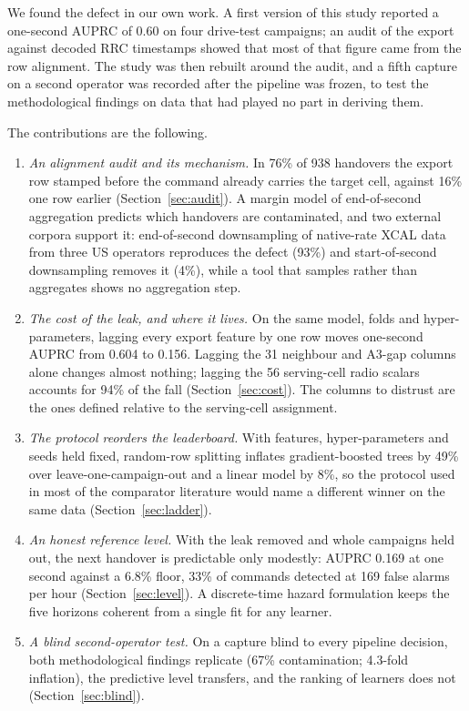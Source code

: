 \documentclass[preprint,review,12pt]{elsarticle}\usepackage{lineno}\linenumbers
\begin{document}
We found the defect in our own work. A first version of this study reported a one-second AUPRC of 0.60 on four drive-test campaigns; an audit of the export against decoded RRC timestamps showed that most of that figure came from the row alignment. The study was then rebuilt around the audit, and a fifth capture on a second operator was recorded after the pipeline was frozen, to test the methodological findings on data that had played no part in deriving them.

The contributions are the following.
\begin{enumerate}
\item \emph{An alignment audit and its mechanism.} In 76\% of 938 handovers the export row stamped before the command already carries the target cell, against 16\% one row earlier (Section~\ref{sec:audit}). A margin model of end-of-second aggregation predicts which handovers are contaminated, and two external corpora support it: end-of-second downsampling of native-rate XCAL data from three US operators reproduces the defect (93\%) and start-of-second downsampling removes it (4\%), while a tool that samples rather than aggregates shows no aggregation step.
\item \emph{The cost of the leak, and where it lives.} On the same model, folds and hyper-parameters, lagging every export feature by one row moves one-second AUPRC from 0.604 to 0.156. Lagging the 31 neighbour and A3-gap columns alone changes almost nothing; lagging the 56 serving-cell radio scalars accounts for 94\% of the fall (Section~\ref{sec:cost}). The columns to distrust are the ones defined relative to the serving-cell assignment.
\item \emph{The protocol reorders the leaderboard.} With features, hyper-parameters and seeds held fixed, random-row splitting inflates gradient-boosted trees by 49\% over leave-one-campaign-out and a linear model by 8\%, so the protocol used in most of the comparator literature would name a different winner on the same data (Section~\ref{sec:ladder}).
\item \emph{An honest reference level.} With the leak removed and whole campaigns held out, the next handover is predictable only modestly: AUPRC 0.169 at one second against a 6.8\% floor, 33\% of commands detected at 169 false alarms per hour (Section~\ref{sec:level}). A discrete-time hazard formulation keeps the five horizons coherent from a single fit for any learner.
\item \emph{A blind second-operator test.} On a capture blind to every pipeline decision, both methodological findings replicate (67\% contamination; 4.3-fold inflation), the predictive level transfers, and the ranking of learners does not (Section~\ref{sec:blind}).
\end{enumerate}
\end{document}

